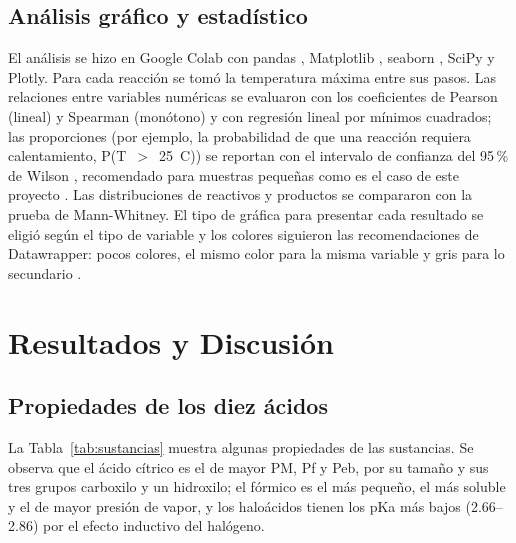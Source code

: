 \documentclass[twoside,twocolumn,10pt]{article}
\begin{document}
\subsection{Análisis gráfico y estadístico}
El análisis se hizo en Google Colab con pandas \cite{McKinney2010}, Matplotlib \cite{Hunter2007}, seaborn \cite{Waskom2021}, SciPy \cite{Virtanen2020} y Plotly. Para cada reacción se tomó la temperatura máxima entre sus pasos. Las relaciones entre variables numéricas se evaluaron con los coeficientes de Pearson (lineal) y Spearman (monótono) y con regresión lineal por mínimos cuadrados; las proporciones (por ejemplo, la probabilidad de que una reacción requiera calentamiento, P(T~$>$~25~\textdegree C)) se reportan con el intervalo de confianza del 95\,\% de Wilson \cite{Wilson1927}, recomendado para muestras pequeñas como es el caso de este proyecto \cite{Brown2001}. Las distribuciones de reactivos y productos se compararon con la prueba de Mann-Whitney. El tipo de gráfica para presentar cada resultado se eligió según el tipo de variable \cite{Datavizcatalogue} y los colores siguieron las recomendaciones de Datawrapper: pocos colores, el mismo color para la misma variable y gris para lo secundario \cite{Datawrapper}.

\section{Resultados y Discusión}
\fontsize{12}{14}\selectfont
\subsection{Propiedades de los diez ácidos}
La Tabla~\ref{tab:sustancias} muestra algunas propiedades de las sustancias. Se observa que el ácido cítrico es el de mayor PM, Pf y Peb, por su tamaño y sus tres grupos carboxilo y un hidroxilo; el fórmico es el más pequeño, el más soluble y el de mayor presión de vapor, y los haloácidos tienen los pKa más bajos (2.66–2.86) por el efecto inductivo del halógeno.
\end{document}
